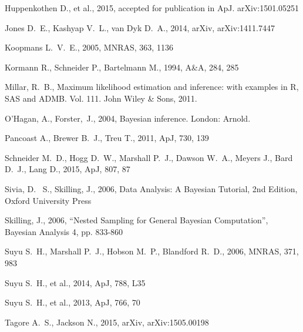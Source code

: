 \documentclass[useAMS,usenatbib]{mn2e}
\begin{document}
\begin{thebibliography}{99}
 Huppenkothen D., et al., 2015,
accepted for publication in ApJ. arXiv:1501.05251 

 Jones D.~E., Kashyap V.~L., van Dyk D.~A., 2014, arXiv, arXiv:1411.7447

Koopmans L.~V.~E., 2005, MNRAS, 363, 1136

 Kormann R., Schneider P., Bartelmann M., 1994, A\&A, 284, 285

Millar, R.~B., Maximum likelihood estimation and inference: with examples in R, SAS and ADMB. Vol. 111. John Wiley \& Sons, 2011.

O'Hagan, A., Forster,~J., 2004, Bayesian inference. London: Arnold.

 Pancoast A., Brewer B.~J., Treu T., 2011, ApJ, 730, 139

 Schneider M.~D., Hogg D.~W., Marshall 
P.~J., Dawson W.~A., Meyers J., Bard D.~J., Lang D., 2015, ApJ, 807, 87

 Sivia, 
D.~ S., Skilling, J., 2006, Data Analysis: A Bayesian Tutorial, 2nd 
Edition, Oxford University Press

 Skilling, 
J., 2006, ``Nested Sampling for General Bayesian Computation'', Bayesian 
Analysis 4, pp. 833-860

Suyu S.~H., Marshall P.~J., Hobson M.~P., Blandford R.~D., 2006, MNRAS, 
371, 983

Suyu S.~H., et al., 2014, ApJ, 788, L35 

Suyu S.~H., et al., 2013, ApJ, 766, 70 

 Tagore A.~S., Jackson N., 2015, arXiv, arXiv:1505.00198


\end{thebibliography}
\end{document}
